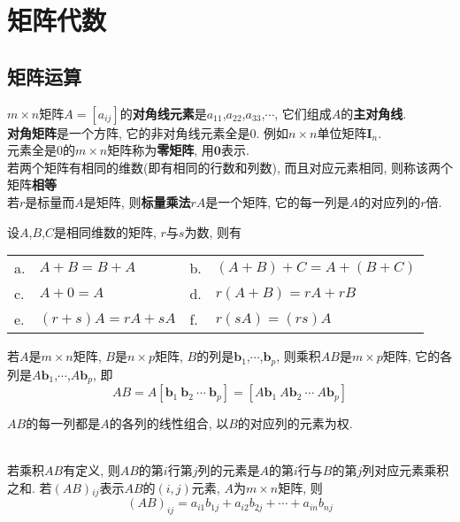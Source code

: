 \chapter{矩阵代数}
\section{矩阵运算}
$m\times n$矩阵$A=[a_{ij}]$的\textbf{对角线元素}是$a_{11}$,$a_{22}$,$a_{33}$,$\cdots$, 它们组成$A$的\textbf{主对角线}.\\[1ex]
\textbf{对角矩阵}是一个方阵, 它的非对角线元素全是0. 例如$n\times n$单位矩阵$\bm{I}_n$.\\[1ex]
元素全是0的$m\times n$矩阵称为\textbf{零矩阵}, 用$\bm{0}$表示.\\[1ex]
若两个矩阵有相同的维数(即有相同的行数和列数), 而且对应元素相同, 则称该两个矩阵\textbf{相等}\\[1ex]
若$r$是标量而$A$是矩阵, 则\textbf{标量乘法}$rA$是一个矩阵, 它的每一列是$A$的对应列的$r$倍.\\[2ex]

\begin{TheoremOne}
设$A$,$B$,$C$是相同维数的矩阵, $r$与$s$为数, 则有\\
\begin{tabular}{l@{\ }l@{\hspace{5em}}l@{\ }l}
a. & $A+B=B+A$ & b. & $(A+B)+C=A+(B+C)$\\
c. & $A+0=A$ & d. & $r(A+B)=rA+rB$\\
e. & $(r+s)A=rA+sA$ & f. & $r(sA)=(rs)A$
\end{tabular}
\end{TheoremOne}\vspace{4ex}

\begin{definition}
若$A$是$m\times n$矩阵, $B$是$n\times p$矩阵, $B$的列是$\bm{b}_1$,$\cdots$,$\bm{b}_p$, 则乘积$AB$是$m\times p$矩阵, 它的各列是$A\bm{b}_1$,$\cdots$,$A\bm{b}_p$, 即
\[AB=A[\bm{b}_1\ \bm{b}_2\ \cdots\ \bm{b}_p]=[A\bm{b}_1\ A\bm{b}_2\ \cdots\ A\bm{b}_p]\]
\end{definition}\vspace{4ex}

\begin{law}
$AB$的每一列都是$A$的各列的线性组合, 以$B$的对应列的元素为权.
\end{law}\vspace{4ex}

\begin{law}[计算$AB$的行列法则]\ \\
若乘积$AB$有定义, 则$AB$的第$i$行第$j$列的元素是$A$的第$i$行与$B$的第$j$列对应元素乘积之和. 若$(AB)$${}_{ij}$表示$AB$的$(i,j)$元素, $A$为$m\times n$矩阵, 则
\[(AB)_{ij}=a_{i1}b_{1j}+a_{i2}b_{2j}+\cdots+a_{in}b_{nj}\]
\end{law}\vspace{4ex}

